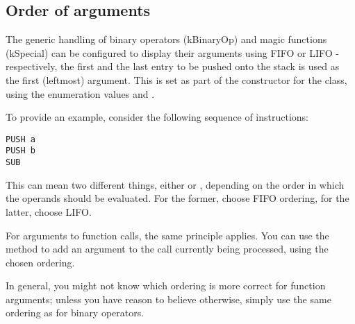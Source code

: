 \subsection{Order of arguments}
\label{sec:argOrder}
The generic handling of binary operators (kBinaryOp) and magic functions (kSpecial) can be configured to display their arguments using FIFO or LIFO - respectively, the first and the last entry to be pushed onto the stack is used as the first (leftmost) argument. This is set as part of the constructor for the  class, using the enumeration values  and .

To provide an example, consider the following sequence of instructions:

\begin{bytecode}
\begin{lstlisting}
PUSH a
PUSH b
SUB
\end{lstlisting}
\end{bytecode}

This can mean two different things, either  or , depending on the order in which the operands should be evaluated. For the former, choose FIFO ordering, for the latter, choose LIFO.

For arguments to function calls, the same principle applies. You can use the  method to add an argument to the call currently being processed, using the chosen ordering.

In general, you might not know which ordering is more correct for function arguments; unless you have reason to believe otherwise, simply use the same ordering as for binary operators.
